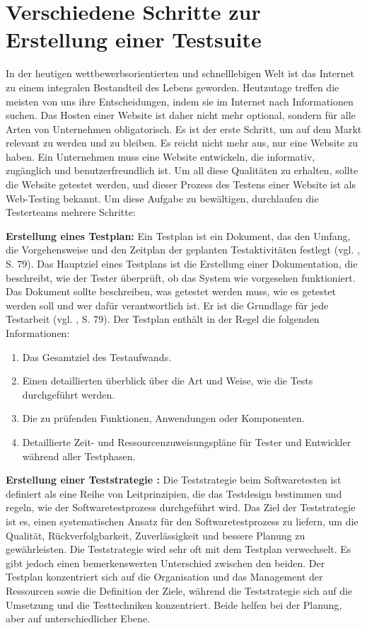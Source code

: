 \section{Verschiedene Schritte zur Erstellung einer Testsuite}\label{sec:verschiedene-schritte-zur-erstellung-einer-testsuite}

In der heutigen wettbewerbsorientierten und schnelllebigen
Welt ist das Internet zu einem integralen Bestandteil des Lebens
geworden. Heutzutage treffen die meisten von uns ihre Entscheidungen,
indem sie im Internet nach Informationen suchen. Das Hosten einer
Website ist daher nicht mehr optional, sondern f\"ur alle Arten von
Unternehmen obligatorisch. Es ist der erste Schritt, um auf dem
Markt relevant zu werden und zu bleiben. Es reicht nicht mehr aus,
nur eine Website zu haben. Ein Unternehmen muss eine Website
entwickeln, die informativ, zug\"anglich und benutzerfreundlich ist.
Um all diese Qualit\"aten zu erhalten, sollte die Website getestet
werden, und dieser Prozess des Testens einer Website ist als Web-Testing
bekannt. Um diese Aufgabe zu bew\"altigen,
durchlaufen die Testerteams mehrere Schritte:

\textbf{Erstellung eines Testplan:} Ein Testplan ist ein Dokument, das den
Umfang, die Vorgehensweise und den Zeitplan der geplanten Testaktivit\"aten
festlegt (vgl. \cite{shultz2011software}, S. 79). Das Hauptziel eines Testplans
ist die Erstellung einer Dokumentation, die beschreibt, wie der Tester
\"uberpr\"uft, ob das System wie vorgesehen funktioniert. Das Dokument sollte
beschreiben, was getestet werden muss, wie es getestet werden soll und wer
daf\"ur verantwortlich ist. Er ist die Grundlage f\"ur jede Testarbeit
(vgl. \cite{shultz2011software}, S. 79). Der Testplan enth\"alt in der Regel die
folgenden Informationen:

\begin{enumerate}
    \item Das Gesamtziel des Testaufwands.
    \item Einen detaillierten \"uberblick \"uber die Art und Weise, wie die Tests
    durchgef\"uhrt werden.
    \item Die zu pr\"ufenden Funktionen, Anwendungen oder Komponenten.
    \item Detaillierte Zeit- und Ressourcenzuweisungspl\"ane f\"ur Tester und
    Entwickler w\"ahrend aller Testphasen.
\end{enumerate}

\textbf{Erstellung einer Teststrategie :} Die Teststrategie beim Softwaretesten
ist definiert als eine Reihe von Leitprinzipien, die das Testdesign
bestimmen und regeln, wie der Softwaretestprozess durchgef\"uhrt wird. Das Ziel
der Teststrategie ist es, einen systematischen Ansatz f\"ur den
Softwaretestprozess zu liefern, um die Qualit\"at, R\"uckverfolgbarkeit,
Zuverl\"assigkeit und bessere Planung zu gew\"ahrleisten. Die
Teststrategie wird sehr oft mit dem Testplan verwechselt. Es gibt jedoch einen
bemerkenswerten Unterschied zwischen den beiden. Der Testplan konzentriert
sich auf die Organisation und das Management der Ressourcen sowie die
Definition der Ziele, w\"ahrend die Teststrategie sich auf die Umsetzung und die
Testtechniken konzentriert. Beide helfen bei der Planung, aber auf
unterschiedlicher Ebene.

